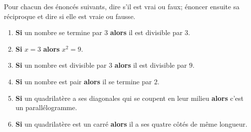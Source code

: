 
\begin{exercice}\label{exosmath-0784}

Pour chacun des énoncés suivants, dire s'il est vrai ou faux; énoncer ensuite sa réciproque et dire si elle est vraie ou fausse.
\begin{enumerate}
    \item
        {\bf Si} un nombre se termine par $3$ {\bf alors} il est divisible par $3$.
\item
    {\bf Si} $x = 3$ {\bf alors} $x^2 = 9$.
\item
    {\bf Si} un nombre est divisible par $3$ {\bf alors} il est divisible par $9$.
\item
    {\bf Si} un nombre est pair {\bf alors} il se termine par $2$.
\item
    {\bf Si} un quadrilatère a ses diagonales qui se coupent en leur milieu {\bf alors} c'est un parallélogramme.
\item
    {\bf Si} un quadrilatère est un carré {\bf alors} il a ses quatre côtés de même longueur.
\end{enumerate}

\end{exercice}
